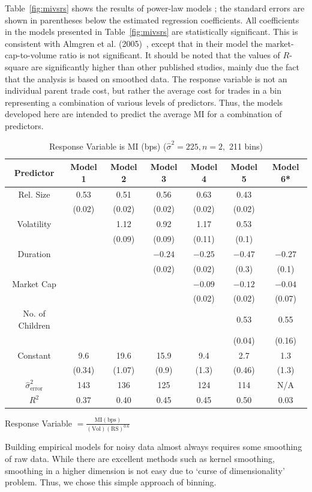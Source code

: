 Table~\ref{fig:mivsrs} shows the results of power-law models ; the standard errors are shown in parentheses below the estimated regression coefficients. All coefficients in the models presented in Table~\ref{fig:mivsrs} are statistically significant. This is consistent with Almgren et al. (2005)~\cite{athl}, except that in their model the market-cap-to-volume ratio is not significant. It should be noted that the values of $R$-square are significantly higher than other published studies, mainly due the fact that the analysis is based on smoothed data. The response variable is not an individual parent trade cost, but rather the average cost for trades in a bin representing a combination of various levels of predictors. Thus, the models developed here are intended to predict the average MI for a combination of predictors.
        \begin{table}[!ht]
        \caption{Response Variable is MI (bps) ($\hat{\sigma}^2=225, n=2,$ 211 bins)\label{tab:responsevarmi}}
        \begin{tabular}{|c|c|c|c|c|c|c|}
        Predictor & Model 1& Model 2 & Model 3 & Model 4 & Model 5 & Model 6* \\ \hline
        Rel. Size & 0.53 & 0.51 & 0.56 & 0.63 & 0.43 & \\
        	& (0.02) & (0.02) & (0.02) & (0.02) & (0.02) & \\
        Volatility & & 1.12 & 0.92 & 1.17 & 0.53 & \\
        	& & (0.09) & (0.09) & (0.11) & (0.1) & \\
        Duration	& & & $-0.24$ & $-0.25$ & $-0.47$ & $-0.27$ \\
        	& & & (0.02) & (0.02) & (0.3) & (0.1) \\
        Market Cap & & & & $-0.09$ & $-0.12$ & $-0.04$ \\
        	& & & & (0.02) & (0.02) & (0.07) \\
        No. of Children & & & & & 0.53 & 0.55 \\
        	& & & & & (0.04) & (0.16) \\
        Constant & 9.6 & 19.6 & 15.9 & 9.4 & 2.7 & 1.3 \\
        	& (0.34) & (1.07) & (0.9) & (1.3) & (0.46) & (1.3) \\ \hline
        $\hat{\sigma}_{\text{error}}^2$ & 143 & 136 & 125 & 124 & 114 & N/A \\
        $R^2$ & 0.37 & 0.40 & 0.45 & 0.45 & 0.50 & 0.03 \\
        \end{tabular} 
        {\small*Response Variable $= \frac{\text{MI}(\text{bps})}{(\text{Vol})(\text{RS})^{0.6}}$}
        \end{table}
Building empirical models for noisy data almost always requires some smoothing of raw data. While there are excellent methods such as kernel smoothing, smoothing in a higher dimension is not easy due to `curse of dimensionality' problem. Thus, we chose this simple approach of binning. 



